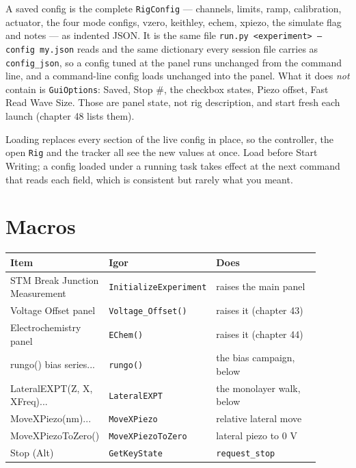A saved config is the complete \texttt{Rig\discretionary{}{}{}Config} --- channels, limits, ramp, calibration, actuator, the four mode configs, vzero, keithley, echem, xpiezo, the simulate flag and notes --- as indented JSON. It is the same file \texttt{run.\discretionary{}{}{}py <experiment> --config my.\discretionary{}{}{}json} reads and the same dictionary every session file carries as \texttt{config\_\discretionary{}{}{}json}, so a config tuned at the panel runs unchanged from the command line, and a command-line config loads unchanged into the panel. What it does \emph{not} contain is \texttt{Gui\discretionary{}{}{}Options}: Saved, Stop \#, the checkbox states, Piezo offset, Fast Read Wave Size. Those are panel state, not rig description, and start fresh each launch (chapter 48 lists them).

Loading replaces every section of the live config in place, so the controller, the open \texttt{Rig} and the tracker all see the new values at once. Load before Start Writing; a config loaded under a running task takes effect at the next command that reads each field, which is consistent but rarely what you meant.

\section{Macros}

\small\setlength{\LTleft}{0pt}\setlength{\LTright}{\fill}
\begin{longtable}{@{}>{\raggedright\arraybackslash}p{0.26\linewidth}>{\raggedright\arraybackslash}p{0.30\linewidth}>{\raggedright\arraybackslash}p{0.34\linewidth}@{}}
\toprule
\textbf{Item} & \textbf{Igor} & \textbf{Does} \\
\midrule\endhead
STM Break Junction Measurement & \texttt{Initialize\discretionary{}{}{}Experiment} & raises the main panel \\
Voltage Offset panel & \texttt{Voltage\_\discretionary{}{}{}Offset()} & raises it (chapter 43) \\
Electrochemistry panel & \texttt{EChem()} & raises it (chapter 44) \\
rungo()  bias series... & \texttt{rungo()} & the bias campaign, below \\
LateralEXPT(Z, X, XFreq)... & \texttt{Lateral\discretionary{}{}{}EXPT} & the monolayer walk, below \\
MoveXPiezo(nm)... & \texttt{Move\discretionary{}{}{}XPiezo} & relative lateral move \\
MoveXPiezoToZero() & \texttt{Move\discretionary{}{}{}XPiezo\discretionary{}{}{}To\discretionary{}{}{}Zero} & lateral piezo to 0 V \\
Stop (Alt) & \texttt{Get\discretionary{}{}{}Key\discretionary{}{}{}State} & \texttt{request\_\discretionary{}{}{}stop} \\
\bottomrule
\end{longtable}
\normalsize

